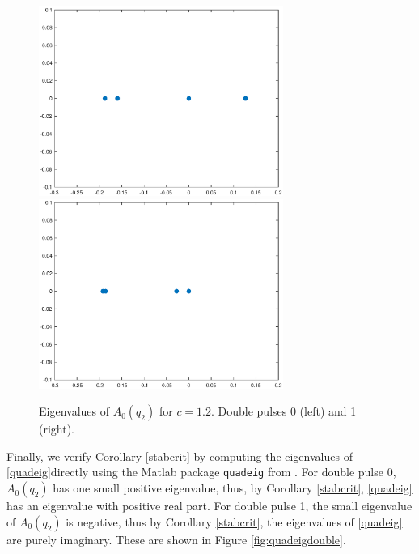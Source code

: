 \documentclass[12pt]{article}
\begin{document}
\begin{figure}[H]
\label{fig:specA0double}
\centering
\includegraphics[width=8cm]{specA0d1}
\includegraphics[width=8cm]{specA0d2}
\caption{Eigenvalues of $A_0(q_2)$ for $c = 1.2$. Double pulses 0 (left) and 1 (right).}
\end{figure}

Finally, we verify Corollary \ref{stabcrit} by computing the eigenvalues of \eqref{quadeig}directly using the Matlab package \texttt{quadeig} from \cite{Hammarling2013}. For double pulse 0, $A_0(q_2)$ has one small positive eigenvalue, thus, by Corollary \ref{stabcrit}, \eqref{quadeig} has an eigenvalue with positive real part. For double pulse 1, the small eigenvalue of $A_0(q_2)$ is negative, thus by Corollary \ref{stabcrit}, the eigenvalues of \eqref{quadeig} are purely imaginary. These are shown in Figure \ref{fig:quadeigdouble}.
\end{document}
